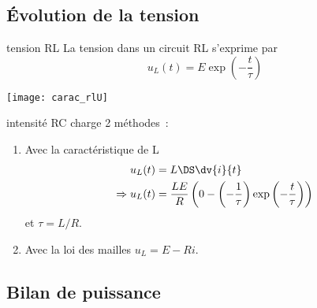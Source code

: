 \documentclass[../main/main.tex]{subfiles}
\begin{document}
\subsection{Évolution de la tension}
\begin{tcbraster}[raster columns=2, raster equal height=rows]
    \begin{prop}[label=prop:irc-charge, sidebyside, righthand ratio=.45]{tension RL}
        La tension dans un circuit RL s'exprime par
        \[\boxed{u_L(t) = E\exp \left(-\frac{t}{\tau} \right)}\]
        \tcblower
        \begin{center}
            \hspace*{-12pt}\texttt{[image: carac\_rlU]}
        \end{center}
    \end{prop}
    \begin{demo}[label=demo:irc-charge]{intensité RC charge}
        2 méthodes~:
        \begin{enumerate}
            \item Avec la caractéristique de L
                \begin{align*}
                                u_L(t) &= L\DS \dv{i}{t}\\
                    \Rightarrow u_L(t) &= \frac{LE}{R} \left(0 -
                        \left(-\frac{1}{\tau} \right)
                        \exp \left(- \frac{t}{\tau} \right) \right)
                \end{align*}
                et $\tau = L/R$.
            \item Avec la loi des mailles $u_L = E - Ri$.
        \end{enumerate}
    \end{demo}
\end{tcbraster}

\subsection{Bilan de puissance}
\end{document}
